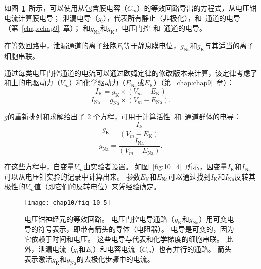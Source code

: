 \begin{proposition}[从电压钳数据计算膜电导] \label{box:10_2}
	
	\quad \quad 如图~\ref{fig:10_5}~所示，可以使用从包含膜电容（$C_m$）的等效回路导出的方程式，从电压钳电流计算膜电导；
	泄漏电导（$g_l$），代表所有静止（非极化），和~通道的电导（第~\ref{chap:chap9}~章）；
	和$g_\text{Na}$和$g_\text{K}$，电压门控~和~通道的电导。
	
	\quad \quad 在等效回路中，泄漏通道的离子细胞$E_l$等于静息膜电位，$g_\text{Na}$和$g_\text{K}$与其适当的离子细胞串联。
	
	\quad \quad 通过每类电压门控通道的电流可以通过欧姆定律的修改版本来计算，该定律考虑了和上的电驱动力（$V_m$）和化学驱动力（$E_{\text{Na}}$或$E_\text{K}$）（第~\ref{chap:chap9}~章）：
	\begin{equation}
		I_\text{K} = g_\text{K} \times (V_m - E_\text{K})
	\end{equation}
	\begin{equation}
		I_\text{Na} = g_\text{Na} \times (V_m - E_{\text{Na}}).
	\end{equation}
	
	\quad \quad $g$的重新排列和求解给出了 2 个方程，可用于计算活性~和~通道群体的电导：
	\begin{equation}
		g_\text{K} = \frac{I_k}{(V_m - E_\text{K})}
	\end{equation}
	\begin{equation}
		g_\text{Na} = \frac{I_\text{Na}}{(V_m - E_{\text{Na}})}.
	\end{equation}
	
	\quad \quad 在这些方程中，自变量$V_m$由实验者设置。
	如图~\ref{fig:10_4}~所示，因变量$I_\text{K}$和$I_\text{Na}$可以从电压钳实验的记录中计算出来。
	参数$E_\text{K}$和$E_{\text{Na}}$可以通过找到$I_\text{K}$和$I_\text{Na}$反转其极性的$V_m$值（即它们的反转电位）来凭经验确定。
	
\end{proposition}


\begin{figure}[htbp]
	\centering
	\texttt{[image: chap10/fig\_10\_5]}
	\caption{电压钳神经元的等效回路。
		电压门控电导通路（$g_\text{K}$和$g_\text{Na}$）用可变电导的符号表示，即带有箭头的导体（电阻器）。
		电导是可变的，因为它依赖于时间和电压。
		这些电导与代表和化学梯度的细胞串联。
		此外，泄漏电流（$g_l$和$E_l$）和电容电流（$C_m$）也有并行的通路。
		箭头表示激活$g_\text{K}$和$g_\text{Na}$的去极化步骤中的电流。}
	\label{fig:10_5}
\end{figure}


